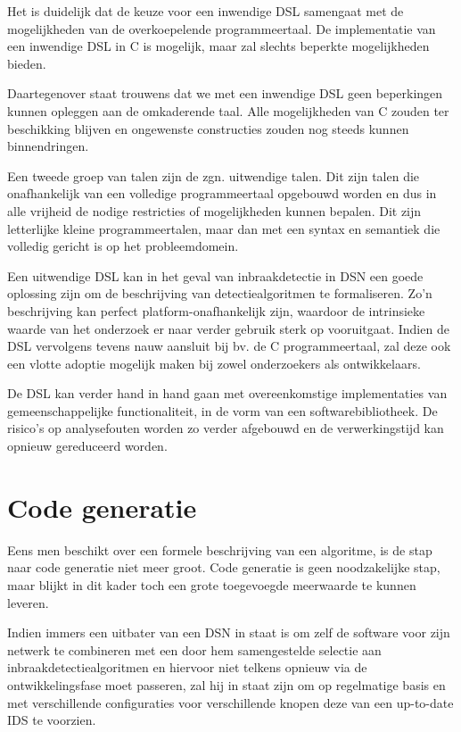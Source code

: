Het is duidelijk dat de keuze voor een inwendige DSL samengaat met de
mogelijkheden van de overkoepelende programmeertaal. De implementatie van een
inwendige DSL in C is mogelijk, maar zal slechts beperkte mogelijkheden bieden.

Daartegenover staat trouwens dat we met een inwendige DSL geen beperkingen
kunnen opleggen aan de omkaderende taal. Alle mogelijkheden van C zouden ter
beschikking blijven en ongewenste constructies zouden nog steeds kunnen
binnendringen.

Een tweede groep van talen zijn de zgn. uitwendige talen. Dit zijn talen die
onafhankelijk van een volledige programmeertaal opgebouwd worden en dus in alle
vrijheid de nodige restricties of mogelijkheden kunnen bepalen. Dit zijn
letterlijke kleine programmeertalen, maar dan met een syntax en semantiek die
volledig gericht is op het probleemdomein.

Een uitwendige DSL kan in het geval van inbraakdetectie in DSN een goede
oplossing zijn om de beschrijving van detectiealgoritmen te formaliseren. Zo'n
beschrijving kan perfect platform-onafhankelijk zijn, waardoor de intrinsieke
waarde van het onderzoek er naar verder gebruik sterk op vooruitgaat. Indien de
DSL vervolgens tevens nauw aansluit bij bv. de C programmeertaal, zal deze ook
een vlotte adoptie mogelijk maken bij zowel onderzoekers als ontwikkelaars.

De DSL kan verder hand in hand gaan met overeenkomstige implementaties van
gemeenschappelijke functionaliteit, in de vorm van een softwarebibliotheek. De
risico's op analysefouten worden zo verder afgebouwd en de verwerkingstijd kan
opnieuw gereduceerd worden.

\section{Code generatie}
\label{section:solution-codegen}

Eens men beschikt over een formele beschrijving van een algoritme, is de stap
naar code generatie niet meer groot. Code generatie is geen noodzakelijke stap,
maar blijkt in dit kader toch een grote toegevoegde meerwaarde te kunnen
leveren.

Indien immers een uitbater van een DSN in staat is om zelf de software voor
zijn netwerk te combineren met een door hem samengestelde selectie aan
inbraakdetectiealgoritmen en hiervoor niet telkens opnieuw via de
ontwikkelingsfase moet passeren, zal hij in staat zijn om op regelmatige basis
en met verschillende configuraties voor verschillende knopen deze van een
up-to-date IDS te voorzien.

